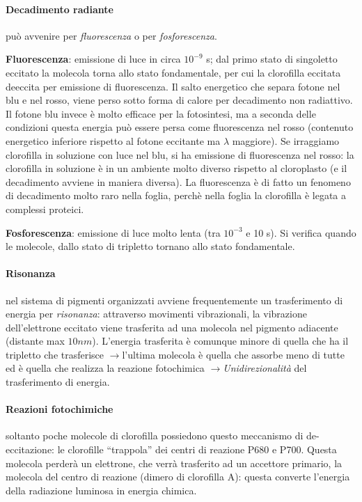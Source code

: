 \documentclass[a4paper,12pt]{book}
\newcommand{\lfreccia}{\ensuremath{\longrightarrow}}
\begin{document}
\paragraph{Decadimento radiante}
può avvenire per \emph{fluorescenza} o per \emph{fosforescenza}.

\textbf{Fluorescenza}: emissione di luce in circa $10^{-9}$ s; dal primo stato di singoletto eccitato la
molecola torna allo stato fondamentale, per cui la clorofilla eccitata deeccita per emissione di fluorescenza.
Il salto energetico che separa fotone nel blu e nel rosso, viene perso sotto forma di calore per decadimento non radiattivo. Il fotone blu invece è molto efficace per la fotosintesi, ma a seconda delle condizioni questa energia può essere persa come fluorescenza nel rosso (contenuto energetico inferiore rispetto al fotone eccitante ma $\lambda$ maggiore). Se irraggiamo clorofilla in soluzione con luce nel blu, si ha emissione di fluorescenza nel rosso: la clorofilla in soluzione è in un ambiente molto diverso rispetto al cloroplasto (e il decadimento avviene in maniera diversa). La fluorescenza è di fatto un fenomeno di decadimento molto raro nella foglia, perchè nella foglia la clorofilla è legata a complessi proteici.

\textbf{Fosforescenza}: emissione di luce molto lenta (tra $10^{-3}$ e 10 s). Si verifica quando le molecole,
dallo stato di tripletto tornano allo stato fondamentale.

\paragraph{Risonanza} nel sistema di pigmenti organizzati avviene frequentemente un trasferimento di energia per \emph{risonanza}: attraverso movimenti vibrazionali, la vibrazione dell'elettrone eccitato viene trasferita ad una molecola nel pigmento adiacente (distante max $10 nm$). L'energia trasferita è comunque minore di quella che ha il tripletto che trasferisce \lfreccia l'ultima molecola è quella che assorbe meno di tutte ed è quella che realizza la reazione fotochimica \lfreccia \emph{Unidirezionalità} del trasferimento di energia.

\paragraph{Reazioni fotochimiche} soltanto poche molecole di clorofilla possiedono questo meccanismo di de-eccitazione: le clorofille “trappola” dei centri di reazione P680 e P700.
Questa molecola perderà un elettrone, che verrà trasferito ad un accettore primario, la molecola del centro di reazione (dimero di clorofilla A): questa converte l'energia della radiazione luminosa in energia chimica.
\end{document}
